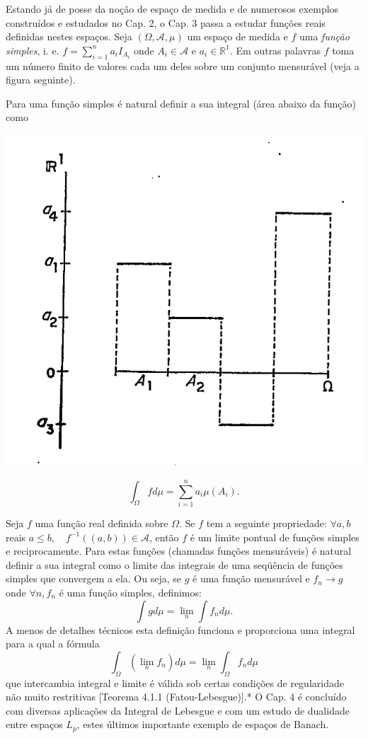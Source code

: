 \documentclass[
]{book}
\begin{document}
Estando já de posse da noção de espaço de medida e de numerosos exemplos construídos e estudados no Cap. 2, o Cap. 3 passa a estudar funções reais definidas nestes espaços. Seja \((\Omega, \mathscr{A}, \mu)\) um espaço de medida e \(f\) uma \emph{função simples}, i. e. \(f = \sum_{i=1}^{n} a_i I_{A_i}\) onde \(A_i \in \mathscr{A}\) e \(a_i \in \mathbb{R}^1\). Em outras palavras \(f\) toma um número finito de valores cada um deles sobre um conjunto mensurável (veja a figura seguinte).

Para uma função simples é natural definir a sua integral (área abaixo da função) como

\begin{center}\includegraphics[width=9.49in]{figures/figure-00-01-01} \end{center}

\[ \int_{\Omega} f d\mu = \sum_{i=1}^{n} a_i \mu(A_i). \]

Seja \(f\) uma função real definida sobre \(\Omega\). Se \(f\) tem a seguinte propriedade: \(\forall a, b\) reais \(a \le b, \quad f^{-1}((a, b)) \in \mathscr{A}\), então \(f\) é um limite pontual de funções simples e reciprocamente. Para estas funções (chamadas funções mensuráveis) é natural definir a sua integral como o limite das integrais de uma seqüência de funções simples que convergem a ela. Ou seja, se \(g\) é uma função mensurável e \(f_n \to g\) onde \(\forall n, f_n\) é uma função simples, definimos: \[ \int g d\mu = \lim_{n} \int f_n d\mu. \] A menos de detalhes técnicos esta definição funciona e proporciona uma integral para a qual a fórmula \[ \int_{\Omega} (\lim_n f_n) d\mu = \lim_n \int_{\Omega} f_n d\mu \] que intercambia integral e limite é válida sob certas condições de regularidade não muito restritivas {[}Teorema 4.1.1 (Fatou-Lebesgue){]}.* O Cap. 4 é concluído com diversas aplicações da Integral de Lebesgue e com um estudo de dualidade entre espaços \(L_p\), estes últimos importante exemplo de espaços de Banach.
\end{document}
